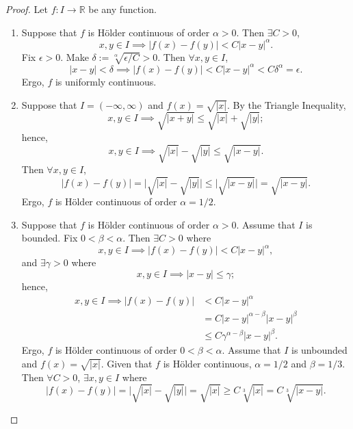 \documentclass{amsart}
\theoremstyle{definition}
\begin{document}
\begin{proof}
    Let $f: I \to \mathbb{R}$ be any function. 
    \begin{enumerate}[label = (\alph*)]
        \item Suppose that $f$ is H\"{o}lder continuous of order $\alpha > 0$. Then $\exists C > 0$,
        \[
        x,y \in I \implies \vert f(x) - f(y) \vert < C\vert x - y \vert^{\alpha}.
        \]
        Fix $\epsilon > 0$. Make $\delta := \sqrt[\alpha]{\epsilon/C} > 0$. Then $\forall x,y \in I$, 
        \[
        \vert x - y \vert < \delta \implies \vert f(x) - f(y) \vert < C\vert x-y \vert^{\alpha} < C\delta^{\alpha} = \epsilon.
        \]  
        Ergo, $f$ is uniformly continuous. 
        \item Suppose that $I = (-\infty,\infty)$ and $f(x) = \sqrt{\vert x \vert}$. By the Triangle Inequality,
        \[
        x,y \in I \implies \sqrt{\vert x + y \vert} \leq \sqrt{\vert x \vert} + \sqrt{\vert y \vert};
        \]
        hence,
        \[
        x,y \in I \implies \sqrt{\vert x \vert} - \sqrt{\vert y \vert} \leq \sqrt{\vert x-y \vert}.
        \]
        Then $\forall x,y \in I$, 
        \[
        \vert f(x) - f(y) \vert = \vert \sqrt{\vert x \vert} - \sqrt{\vert y \vert} \vert \leq \vert \sqrt{\vert x - y \vert} \vert = \sqrt{\vert x - y \vert}.
        \]
        Ergo, $f$ is H\"{o}lder continuous of order $\alpha = 1/2$.
        \item Suppose that $f$ is H\"{o}lder continuous of order $\alpha > 0$. Assume that $I$ is bounded. Fix $0 < \beta < \alpha$. Then $\exists C > 0$ where 
        \[
        x,y \in I \implies \vert f(x) - f(y) \vert < C\vert x - y \vert^{\alpha},
        \]
        and $\exists \gamma > 0$ where 
        \[
        x,y \in I \implies \vert x - y \vert \leq \gamma;
        \]
        hence,
        \begin{align*}
            x,y \in I \implies \vert f(x) - f(y) \vert &< C\vert x - y \vert^{\alpha} \\
            &= C\vert x - y \vert^{\alpha - \beta}\vert x - y \vert^{\beta} \\
            &\leq  C\gamma^{\alpha - \beta}\vert x - y \vert^{\beta}.
        \end{align*}
        Ergo, $f$ is H\"{o}lder continuous of order $0 < \beta < \alpha$. Assume that $I$ is unbounded and $f(x) = \sqrt{\vert x \vert}$. Given that $f$ is H\"{o}lder continuous, $\alpha = 1/2$ and $\beta = 1/3$. Then $\forall C > 0$, $\exists x,y \in I$ where 
        \[
        \vert f(x) - f(y) \vert = \vert \sqrt{\vert x \vert} - \sqrt{\vert y \vert} \vert = \sqrt{\vert x \vert} \geq C\sqrt[3]{\vert x \vert} = C\sqrt[3]{\vert x - y \vert}.
\]
\end{enumerate}
\end{proof}
\end{document}
